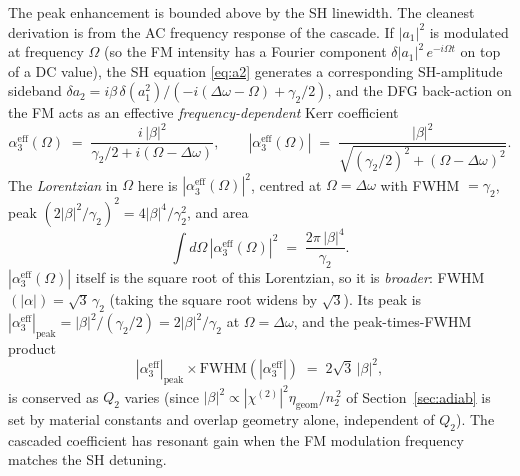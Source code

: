\documentclass[11pt,a4paper]{article}
\newcommand{\chitwo}{\chi^{(2)}}
\newcommand{\Dom}{\Delta\omega}
\begin{document}
The peak enhancement is bounded above by the SH linewidth.  The
cleanest derivation is from the AC frequency response of the cascade.
If $|a_1|^{2}$ is modulated at frequency $\Omega$ (so the FM intensity
has a Fourier component $\delta|a_1|^{2}\,e^{-i\Omega t}$ on top of a
DC value), the SH equation \eqref{eq:a2} generates a corresponding
SH-amplitude sideband
$\delta a_2 = i\beta\,\delta(a_1^{2})/(-\!i(\Dom-\Omega)+\gamma_2/2)$,
and the DFG back-action on the FM acts as an effective \emph{frequency-dependent}
Kerr coefficient
\begin{equation}
  \alpha_3^{\text{eff}}(\Omega)
   \;=\;\frac{i\,|\beta|^{2}}{\gamma_2/2+i(\Omega-\Dom)},
  \qquad
  |\alpha_3^{\text{eff}}(\Omega)|
   \;=\;\frac{|\beta|^{2}}{\sqrt{(\gamma_2/2)^{2}+(\Omega-\Dom)^{2}}}.
  \label{eq:alpha3-AC}
\end{equation}
The \emph{Lorentzian} in $\Omega$ here is $|\alpha_3^{\text{eff}}(\Omega)|^{2}$,
centred at $\Omega=\Dom$ with FWHM $=\gamma_2$, peak
$(2|\beta|^{2}/\gamma_2)^{2}=4|\beta|^{4}/\gamma_2^{2}$, and area
\begin{equation}
  \int\!d\Omega\,|\alpha_3^{\text{eff}}(\Omega)|^{2}
   \;=\;\frac{2\pi\,|\beta|^{4}}{\gamma_2}.
  \label{eq:area-rule}
\end{equation}
$|\alpha_3^{\text{eff}}(\Omega)|$ itself is the square root of this
Lorentzian, so it is \emph{broader}: FWHM$(|\alpha|)=\sqrt{3}\,\gamma_2$
(taking the square root widens by $\sqrt{3}$).  Its peak is
$|\alpha_3^{\text{eff}}|_\text{peak}=|\beta|^{2}/(\gamma_2/2)=2|\beta|^{2}/\gamma_2$
at $\Omega=\Dom$, and the peak-times-FWHM product
\begin{equation}
  |\alpha_3^{\text{eff}}|_\text{peak}\times \text{FWHM}(|\alpha_3^{\text{eff}}|)
  \;=\;2\sqrt{3}\,|\beta|^{2},
\end{equation}
is conserved as $Q_2$ varies (since $|\beta|^{2}\propto|\chitwo|^{2}\eta_\text{geom}/n_2^{\,2}$
of Section~\ref{sec:adiab} is set by material constants and overlap
geometry alone, independent of $Q_2$).  The cascaded coefficient has
resonant gain when the FM modulation frequency matches the SH detuning.
\end{document}
